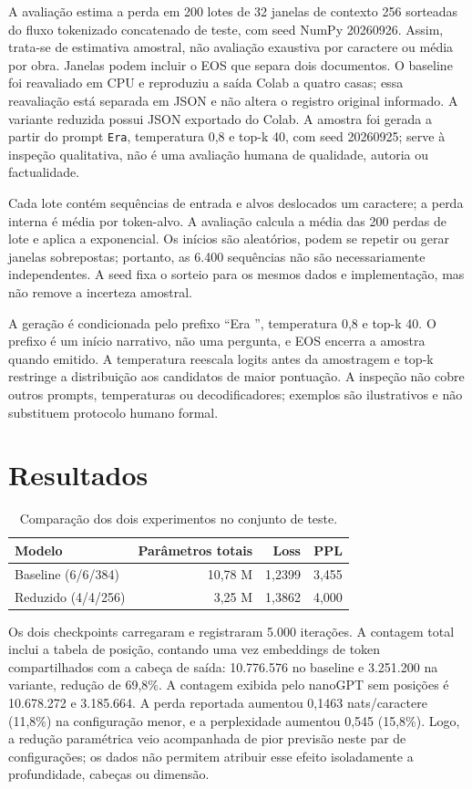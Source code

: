 \documentclass[conference]{IEEEtran}
\begin{document}
A avaliação estima a perda em 200 lotes de 32 janelas de contexto 256 sorteadas do fluxo tokenizado concatenado de teste, com seed NumPy 20260926. Assim, trata-se de estimativa amostral, não avaliação exaustiva por caractere ou média por obra. Janelas podem incluir o EOS que separa dois documentos. O baseline foi reavaliado em CPU e reproduziu a saída Colab a quatro casas; essa reavaliação está separada em JSON e não altera o registro original informado. A variante reduzida possui JSON exportado do Colab. A amostra foi gerada a partir do prompt \texttt{Era}, temperatura 0,8 e top-k 40, com seed 20260925; serve à inspeção qualitativa, não é uma avaliação humana de qualidade, autoria ou factualidade.

Cada lote contém sequências de entrada e alvos deslocados um caractere; a perda interna é média por token-alvo. A avaliação calcula a média das 200 perdas de lote e aplica a exponencial. Os inícios são aleatórios, podem se repetir ou gerar janelas sobrepostas; portanto, as 6.400 sequências não são necessariamente independentes. A seed fixa o sorteio para os mesmos dados e implementação, mas não remove a incerteza amostral.

A geração é condicionada pelo prefixo “Era ”, temperatura 0,8 e top-k 40. O prefixo é um início narrativo, não uma pergunta, e EOS encerra a amostra quando emitido. A temperatura reescala logits antes da amostragem e top-k restringe a distribuição aos candidatos de maior pontuação. A inspeção não cobre outros prompts, temperaturas ou decodificadores; exemplos são ilustrativos e não substituem protocolo humano formal.

\section{Resultados}

\begin{table}[t]
\caption{Comparação dos dois experimentos no conjunto de teste.}
\label{tab:comparison}
\centering
\begin{tabular}{lrrr}
\toprule
Modelo & Parâmetros totais & Loss & PPL \\
\midrule
Baseline (6/6/384) & 10,78 M & 1,2399 & 3,455 \\
Reduzido (4/4/256) & 3,25 M & 1,3862 & 4,000 \\
\bottomrule
\end{tabular}
\end{table}

Os dois checkpoints carregaram e registraram 5.000 iterações. A contagem total inclui a tabela de posição, contando uma vez embeddings de token compartilhados com a cabeça de saída: 10.776.576 no baseline e 3.251.200 na variante, redução de 69,8\%. A contagem exibida pelo nanoGPT sem posições é 10.678.272 e 3.185.664. A perda reportada aumentou 0,1463 nats/caractere (11,8\%) na configuração menor, e a perplexidade aumentou 0,545 (15,8\%). Logo, a redução paramétrica veio acompanhada de pior previsão neste par de configurações; os dados não permitem atribuir esse efeito isoladamente a profundidade, cabeças ou dimensão.
\end{document}
